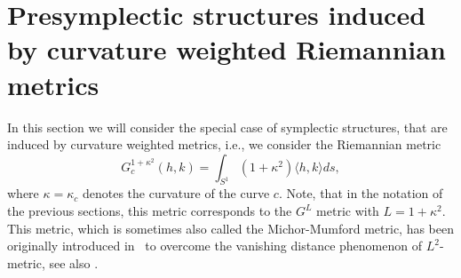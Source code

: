 \documentclass[12pt]{amsart}
\theoremstyle{definition}
\def\ka{\kappa}
\begin{document}
\section{Presymplectic structures induced by curvature weighted Riemannian metrics}\label{sec:curvature_weighted}
In this section we will consider the special case of symplectic structures, that are induced by curvature weighted metrics, i.e., we consider the Riemannian metric
\begin{equation}
G^{1+\ka^2}_c(h,k)=\int_{S^1}(1+\ka^2)\langle h,k\rangle ds,
\end{equation}
where $\ka=\ka_c$ denotes the curvature of the curve $c$. Note, that in the notation of the previous sections, this metric corresponds to the $G^L$ metric with $L=1+\ka^2$. This metric, which is sometimes also called the Michor-Mumford metric, has been originally introduced in~\cite{michor_mumford2006} to overcome the vanishing distance phenomenon of $L^2$-metric, see also \cite{michor2005vanishing}. 
\end{document}
